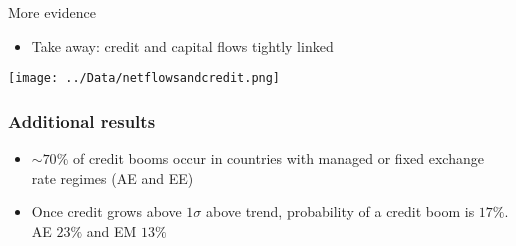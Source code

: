 \documentclass{beamer}
\begin{document}
\begin{frame}{More evidence}
\begin{itemize}
\item Take away: credit and capital flows tightly linked
\end{itemize}
\centering
\texttt{[image: ../Data/netflowsandcredit.png]}
\end{frame}

\begin{frame}
\frametitle{Additional results}
\begin{itemize}
\item $\sim 70\%$
of credit booms occur in countries with managed or fixed exchange rate regimes (AE and EE)
\item Once credit grows above $1\sigma$ above trend, probability of a credit boom is $17\%$. AE $23 \%$ and EM $13\%$
\end{itemize}
\end{frame}
\end{document}
